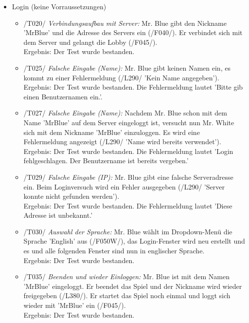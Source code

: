 \documentclass[a4paper]{article}
\begin{document}
\begin{itemize}
	\item Login (keine Vorraussetzungen)
	\begin{itemize}
		
		\item /T020/ \textit{Verbindungsaufbau mit Server:} Mr. Blue gibt den Nickname 'MrBlue' und die Adresse des 			Servers ein (/F040/). Er verbindet sich mit dem Server und gelangt die Lobby (/F045/). \\
		Ergebnis: Der Test wurde bestanden.
		
		\item /T025/ \textit{Falsche Eingabe (Name):} Mr. Blue gibt keinen Namen ein, es kommt zu einer Fehlermeldung 				(/L290/ 'Kein Name angegeben'). \\
		Ergebnis: Der Test wurde bestanden. Die Fehlermeldung lautet 'Bitte gib einen Benutzernamen ein.'.
		
		\item /T027/ \textit{Falsche Eingabe (Name):} Nachdem Mr. Blue schon mit dem Name 'MrBlue' auf dem Server eingeloggt ist, versucht nun Mr. White sich mit dem Nickname 'MrBlue' einzuloggen. Es wird eine Fehlermeldung angezeigt (/L290/ 			'Name wird bereits verwendet'). \\
		Ergebnis: Der Test wurde bestanden. Die Fehlermeldung lautet 'Login fehlgeschlagen. Der Benutzername ist bereits 			vergeben.'
		
		\item /T029/ \textit{Falsche Eingabe (IP):} Mr. Blue gibt eine falsche Serveradresse ein. Beim 			Loginversuch wird ein Fehler ausgegeben (/L290/  'Server konnte nicht gefunden werden'). \\
		Ergebnis: Der Test wurde bestanden. Die Fehlermeldung lautet 'Diese Adresse ist unbekannt.'
		
		\item /T030/ \textit{Auswahl der Sprache:} Mr. Blue wählt im Dropdown-Menü die Sprache 'English' aus (/F050W/), 			das Login-Fenster wird neu erstellt und es und alle folgenden Fenster sind nun in englischer Sprache. \\
		Ergebnis: Der Test wurde bestanden.
		
		\item /T035/ \textit{Beenden und wieder Einloggen:} Mr. Blue ist mit dem Namen 'MrBlue' eingeloggt. Er beendet das 		Spiel und der Nickname wird wieder freigegeben (/L380/). Er startet das Spiel noch einmal und loggt sich wieder mit 			'MrBlue' ein (/F045/). \\
		Ergebnis: Der Test wurde bestanden.
		

\end{itemize}
\end{itemize}
\end{document}
